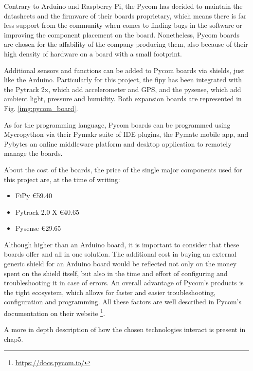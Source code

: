 		Contrary to Arduino and Raspberry Pi, the Pycom has decided to maintain the datasheets and the firmware of their boards proprietary, which means there is far less support from the community when comes to finding bugs in the software or improving the component placement on the board.
		Nonetheless, Pycom boards are chosen for the affability of the company producing them, also because of their high density of hardware on a board with a small footprint.
		
		Additional sensors and functions can be added to Pycom boards via shields, just like the Arduino.
		Particularly for this project, the fipy has been integrated with the Pytrack 2x, which add accelerometer and GPS, and the pysense, which add ambient light, pressure and humidity.
		Both expansion boards are represented in Fig. \ref{img:pycom_board}.
				
		As for the programming language, Pycom boards can be programmed using Mycropython via their Pymakr suite of IDE plugins, the Pymate mobile app, and Pybytes an online middleware platform and desktop application to remotely manage the boards.
		
		About the cost of the boards, the price of the single major components used for this project are, at the time of writing:
		\begin{itemize}[noitemsep]
			\item FiPy €59.40
			\item Pytrack 2.0 X €40.65
			\item Pysense €29.65
		\end{itemize}
		
		Although higher than an Arduino board, it is important to consider that these boards offer and all in one solution.
		The additional cost in buying an external generic shield for an Arduino board would be reflected not only on the money spent on the shield itself, but also in the time and effort of configuring and troubleshooting it in case of errors.
		An overall advantage of Pycom's products is the tight ecosystem, which allows for faster and easier troubleshooting, configuration and programming.
		All these factors are well described in Pycom's documentation on their website \footnote{\url{https://docs.pycom.io/}}.
		
		A more in depth description of how the chosen technologies interact is present in chap5.	